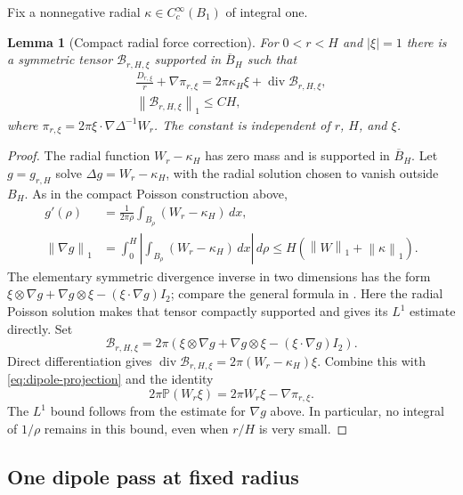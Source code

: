 \documentclass[11pt,a4paper,reqno]{amsart}
\theoremstyle{plain}
\newtheorem{lemma}[theorem]{Lemma}
\theoremstyle{definition}
\theoremstyle{remark}
\numberwithin{equation}{section}
\newcommand{\PP}{\mathbb P}
\newcommand{\Div}{\operatorname{div}}
\newcommand{\norm}[2]{\left\|#1\right\|_{#2}}
\newcommand{\dd}{\,dx}
\begin{document}
Fix a nonnegative radial $\kappa\in C_c^\infty(B_1)$ of integral one.

\begin{lemma}[Compact radial force correction]\label{lem:compact-force}
For $0<r<H$ and $|\xi|=1$ there is a symmetric tensor
$\mathcal B_{r,H,\xi}$ supported in $\overline B_H$ such that
\begin{equation}\label{eq:compact-force}
 \begin{gathered}
 \frac{D_{r,\xi}}r+\nabla\pi_{r,\xi}
       =2\pi \kappa_H\xi+\Div\mathcal B_{r,H,\xi},\\
 \norm{\mathcal B_{r,H,\xi}}1\le CH,
 \end{gathered}
\end{equation}
where $\pi_{r,\xi}=2\pi\xi\cdot\nabla\Delta^{-1}W_r$.
The constant is independent of $r$, $H$, and $\xi$.
\end{lemma}
\begin{proof}
The radial function $W_r-\kappa_H$ has zero mass and is supported in
$\overline B_H$. Let $g=g_{r,H}$ solve $\Delta g=W_r-\kappa_H$, with the
radial solution chosen to vanish outside $B_H$. As in the compact
Poisson construction above,
\[
 \begin{aligned}
 g'(\rho)&=\frac1{2\pi\rho}\int_{B_\rho}(W_r-\kappa_H)\dd,\\
 \norm{\nabla g}1
 &=\int_0^H\left|\int_{B_\rho}(W_r-\kappa_H)\dd\right|\,d\rho
 \le H(\norm W1+\norm\kappa1).
 \end{aligned}
\]
The elementary symmetric divergence inverse in two dimensions has
the form $\xi\otimes\nabla g+\nabla g\otimes\xi
-(\xi\cdot\nabla g)I_2$; compare the general formula in
\cite[(A.7)]{BCK}. Here the radial Poisson solution makes that tensor
compactly supported and gives its $L^1$ estimate directly. Set
\[
 \mathcal B_{r,H,\xi}=2\pi\left(
 \xi\otimes\nabla g+\nabla g\otimes\xi
                 -(\xi\cdot\nabla g)I_2\right).
\]
Direct differentiation gives
$\Div\mathcal B_{r,H,\xi}=2\pi(W_r-\kappa_H)\xi$. Combine this with
\eqref{eq:dipole-projection} and the identity
\[
 2\pi\PP(W_r\xi)=2\pi W_r\xi-\nabla\pi_{r,\xi}.
\]
The $L^1$ bound follows from the estimate for $\nabla g$ above.
In particular, no integral of $1/\rho$ remains in this bound, even
when $r/H$ is very small.
\end{proof}

\subsection{One dipole pass at fixed radius}
\end{document}
